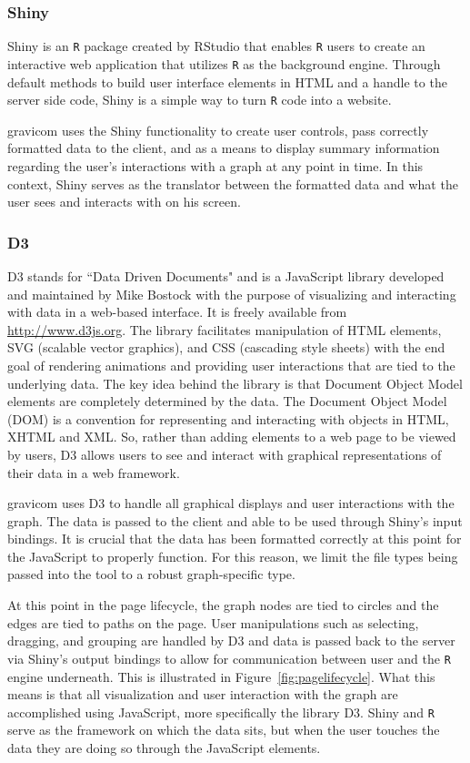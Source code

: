 \documentclass{article}\usepackage[]{graphicx}\usepackage[]{color}
\begin{document}
\subsubsection{Shiny}

Shiny \cite{rs-shiny} is an {\tt R} package created by RStudio that enables {\tt R} users to create an interactive web application that utilizes {\tt R} as the background engine. Through default methods to build user interface elements in HTML and a handle to the server side code, Shiny is a simple way to turn {\tt R} code into a website. 

gravicom uses the Shiny functionality to create user controls, pass correctly formatted data to the client, and as a means to display summary information regarding the user's interactions with a graph at any point in time. In this context, Shiny serves as the translator between the formatted data and what the user sees and interacts with on his screen.


\subsubsection{D3}

D3 \cite{mb-d3} stands for ``Data Driven Documents" and is a JavaScript library developed and maintained by Mike Bostock with the  purpose of visualizing and interacting with data in a web-based interface. It is freely available from \url{http://www.d3js.org}. The library facilitates manipulation of HTML elements, SVG (scalable vector graphics), and CSS (cascading style sheets) with the end goal of rendering animations and providing user interactions that are tied to the underlying data. The key idea behind the library is that Document Object Model elements are completely determined by the data. The Document Object Model (DOM) is a convention for representing and interacting with objects in HTML, XHTML and XML. So, rather than adding elements to a web page to be viewed by users, D3 allows users to see and interact with graphical representations of their data in a web framework. 

gravicom uses D3 to handle all graphical displays and user interactions with the graph. The data is passed to the client and able to be used through Shiny's input bindings. It is crucial that the data has been formatted correctly at this point for the JavaScript to properly function. For this reason, we limit the file types being passed into the tool to a robust graph-specific type.

At this point in the page lifecycle, the graph nodes are tied to circles and the edges are tied to paths on the page. User manipulations such as selecting, dragging, and grouping are handled by D3 and  data is passed back to the server via Shiny's output bindings to allow for communication between user and the {\tt R} engine underneath. This is illustrated in Figure~\ref{fig:pagelifecycle}. What this means is that all visualization and user interaction with the graph are accomplished using JavaScript, more specifically the library D3. Shiny and {\tt R} serve as the framework on which the data sits, but when the user touches the data they are doing so through the JavaScript elements. 
\end{document}
